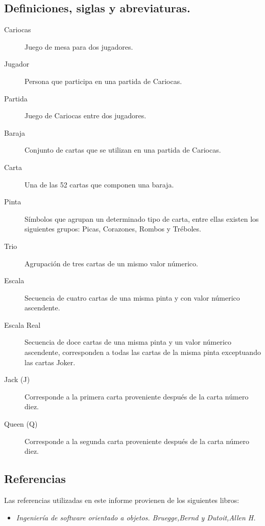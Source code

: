 \subsection{Definiciones, siglas y abreviaturas.}\label{cap:definiciones}
\begin{description}
    \item[Cariocas] Juego de mesa para dos jugadores.
    \item[Jugador] Persona que participa en una partida de Cariocas.
    \item[Partida] Juego de Cariocas entre dos jugadores.
    \item[Baraja] Conjunto de cartas que se utilizan en una partida de Cariocas.
    \item[Carta] Una de las 52 cartas que componen una baraja.
    \item[Pinta] Símbolos que agrupan un determinado tipo de carta, entre ellas existen los siguientes grupos: Picas, Corazones, Rombos y Tréboles.
    \item[Trio] Agrupación de tres cartas de un mismo valor númerico.
    \item[Escala] Secuencia de cuatro cartas de una misma pinta y con valor númerico ascendente.
    \item[Escala Real] Secuencia de doce cartas de una misma pinta y un valor númerico ascendente, corresponden a todas las cartas de la misma pinta exceptuando las cartas Joker.
    \item[Jack (J)] Corresponde a la primera carta proveniente después de la carta número diez.
    \item[Queen (Q)] Corresponde a la segunda carta proveniente después de la carta número diez.
\end{description}

\subsection{Referencias}
Las referencias utilizadas en este informe provienen de los siguientes libros:
\begin{itemize}
    \item \textit{Ingeniería de software orientado a objetos. Bruegge,Bernd y Dutoit,Allen H.} \cite{oop}
\end{itemize}